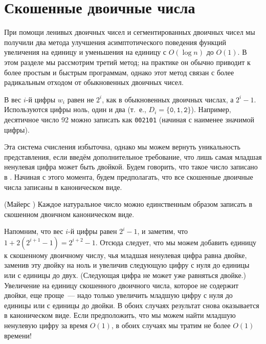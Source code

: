 \section{Скошенные двоичные числа}
\label{sc:9.3}

При помощи ленивых двоичных чисел и сегментированных двоичных чисел мы
получили два метода улучшения асимптотического поведения функций
увеличения на единицу и уменьшения на единицу с $O(\log n)$ до
$O(1)$. В этом разделе мы рассмотрим третий метод; на практике он
обычно приводит к более простым и быстрым программам, однако этот
метод связан с более радикальным отходом от обыкновенных двоичных
чисел.

В 
\cite{Myers1983, Okasaki1995b} вес 
$i$-й цифры $w_i$ равен не $2^i$, как в обыкновенных двоичных числах,
а $2^i - 1$. Используются цифры ноль, один и два (т.~е., $D_i =
\{\mathtt{0}, \mathtt{1}, \mathtt{2}\}$). Например, десятичное число
92 можно записать как \texttt{002101} (начиная с наименее значимой
цифры).

Эта система счисления избыточна, однако мы можем вернуть уникальность
представления, если введём дополнительное требование, что лишь
самая младшая ненулевая цифра может быть двойкой.  Будем говорить, что
такое число записано в . Начиная с этого момента, будем предполагать, что все
скошенные двоичные числа записаны в каноническом виде.

\begin{theorem}\label{th:9.1}
  (Майерс \cite{Myers1983}) Каждое натуральное число можно
  единственным образом записать в скошенном двоичном каноническом виде.
\end{theorem}

Напомним, что вес $i$-й цифры равен $2^i - 1$, и заметим, что $1 +
2(2^{i+1} - 1) = 2^{i+2} - 1$. Отсюда следует, что мы можем добавить
единицу к скошенному двоичному числу, чья младшая ненулевая цифра равна двойке,
заменив эту двойку на ноль и увеличив следующую цифру с нуля до
единицы или с единицы до двух. (Следующая цифра не может уже равняться
двойке.) Увеличение на единицу скошенного двоичного числа, которое не
содержит двойки, еще проще~--- надо только увеличить младшую цифру с
нуля до единицы или с единицы до двойки. В обоих случаях результат
снова оказывается в каноническом виде. Если предположить, что мы можем
найти младшую ненулевую цифру за время $O(1)$, в обоих случаях мы
тратим не более $O(1)$ времени!

